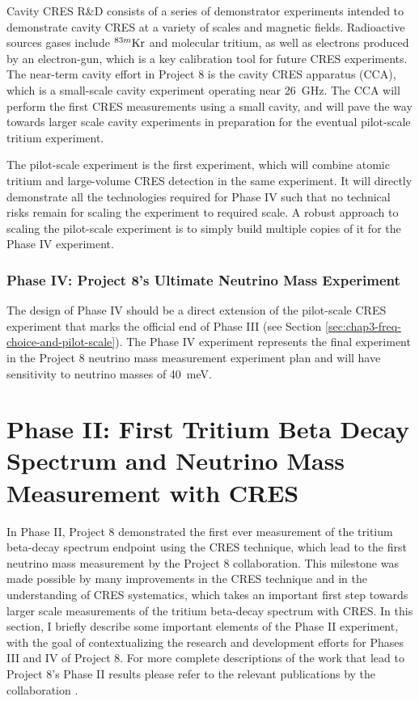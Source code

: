 Cavity CRES R\&D consists of a series of demonstrator experiments intended to demonstrate cavity CRES at a variety of scales and magnetic fields. Radioactive sources gases include $^{83m}\rm{Kr}$ and molecular tritium, as well as electrons produced by an electron-gun, which is a key calibration tool for future CRES experiments. The near-term cavity effort in Project 8 is the cavity CRES apparatus (CCA), which is a small-scale cavity experiment operating near 26~GHz. The CCA will perform the first CRES measurements using a small cavity, and will pave the way towards larger scale cavity experiments in preparation for the eventual pilot-scale tritium experiment. 

The pilot-scale experiment is the first experiment, which will combine atomic tritium and large-volume CRES detection in the same experiment. It will directly demonstrate all the technologies required for Phase IV such that no technical risks remain for scaling the experiment to required scale. A robust approach to scaling the pilot-scale experiment is to simply build multiple copies of it for the Phase IV experiment.

\subsubsection*{Phase IV: Project 8's Ultimate Neutrino Mass Experiment}

The design of Phase IV should be a direct extension of the pilot-scale CRES experiment that marks the official end of Phase III (see Section \ref{sec:chap3-freq-choice-and-pilot-scale}). The Phase IV experiment represents the final experiment in the Project 8 neutrino mass measurement experiment plan and will have sensitivity to neutrino masses of 40~meV. 

\section{Phase II: First Tritium Beta Decay Spectrum and Neutrino Mass Measurement with CRES}
\label{sec:chap3-phaseII}

In Phase II, Project 8 demonstrated the first ever measurement of the tritium beta-decay spectrum endpoint using the CRES technique, which lead to the first neutrino mass measurement by the Project 8 collaboration. This milestone was made possible by many improvements in the CRES technique and in the understanding of CRES systematics, which takes an important first step towards larger scale measurements of the tritium beta-decay spectrum with CRES. In this section, I briefly describe some important elements of the Phase II experiment, with the goal of contextualizing the research and development efforts for Phases III and IV of Project 8. For more complete descriptions of the work that lead to Project 8's Phase II results please refer to the relevant publications by the collaboration \cite{p8prc2023,p8prl2023}.

